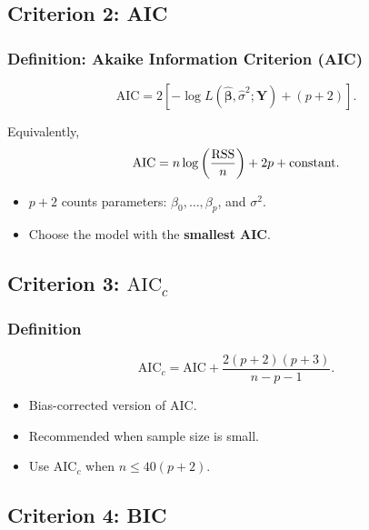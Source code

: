 \subsection{Criterion 2: AIC}

\subsubsection*{Definition: Akaike Information Criterion (AIC)}

\begin{keyresult}
\[
\mathrm{AIC}
=
2\left[-\log L(\hat{\boldsymbol{\beta}}, \hat{\sigma}^2; \mathbf{Y}) + (p+2)\right].
\]

Equivalently,
\[
\mathrm{AIC}
=
n \log\left(\frac{\mathrm{RSS}}{n}\right) + 2p + \text{constant}.
\]

\begin{itemize}
\item $p+2$ counts parameters: $\beta_0, \dots, \beta_p$, and $\sigma^2$.
\item Choose the model with the \textbf{smallest AIC}.
\end{itemize}
\end{keyresult}

\subsection{Criterion 3: $\mathrm{AIC}_c$}

\subsubsection*{Definition}

\begin{keyresult}
\[
\mathrm{AIC}_c
=
\mathrm{AIC}
+
\frac{2(p+2)(p+3)}{n - p - 1}.
\]

\begin{itemize}
\item Bias-corrected version of AIC.
\item Recommended when sample size is small.
\item Use $\mathrm{AIC}_c$ when $n \le 40(p+2)$.
\end{itemize}
\end{keyresult}

\subsection{Criterion 4: BIC}

